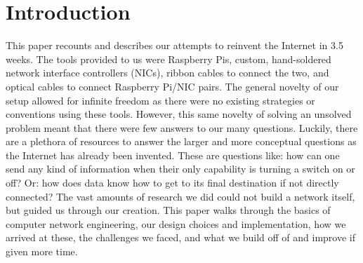 \documentclass[10pt, letterpaper, twocolumn]{article}
\begin{document}
\section{Introduction}
This paper recounts and describes our attempts to reinvent the Internet in 3.5 weeks. The tools provided to us were Raspberry Pis, custom, hand-soldered network interface controllers (NICs), ribbon cables to connect the two, and optical cables to connect Raspberry Pi/NIC pairs. The general novelty of our setup allowed for infinite freedom as there were no existing strategies or conventions using these tools. However, this same novelty of solving an unsolved problem meant that there were few answers to our many questions. Luckily, there are a plethora of resources to answer the larger and more conceptual questions as the Internet has already been invented. These are questions like: how can one send any kind of information when their only capability is turning a switch on or off? Or: how does data know how to get to its final destination if not directly connected? The vast amounts of research we did could not build a network itself, but guided us through our creation. This paper walks through the basics of computer network engineering, our design choices and implementation, how we arrived at these, the challenges we faced, and what we build off of and improve if given more time. 
\end{document}
